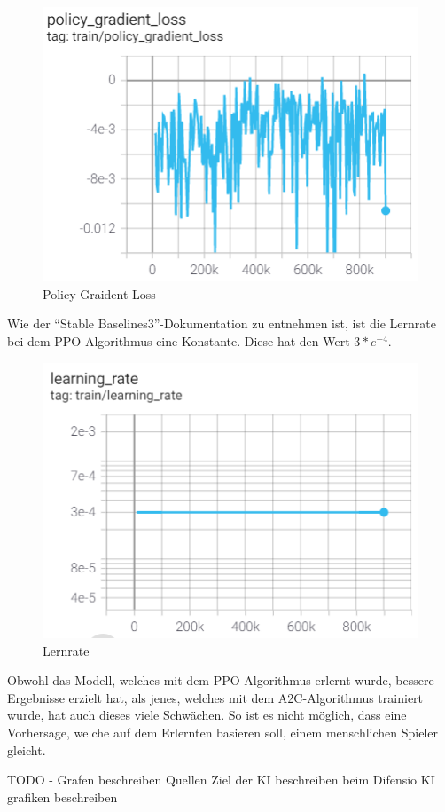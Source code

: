 \begin{figure}[H]
    \centering
    \includegraphics[scale=0.7]{pics/Tensorboard/PPO/policy_loss_new.png}
    \caption{Policy Graident Loss}
    \label{fig:ppo:pgl}
\end{figure}

Wie der ``Stable Baselines3''-Dokumentation %
zu entnehmen ist, ist die Lernrate bei dem PPO Algorithmus eine Konstante.
Diese hat den Wert \(3*e^{-4}\).

\begin{figure}[H]
    \centering
    \includegraphics[scale=0.7]{pics/Tensorboard/PPO/learning_rate_new.png}
    \caption{Lernrate}
    \label{fig:ppo:learningrate}
\end{figure}

Obwohl das Modell, welches mit dem PPO-Algorithmus erlernt wurde,
bessere Ergebnisse erzielt hat, als jenes, welches mit dem A2C-Algorithmus trainiert wurde,
hat auch dieses viele Schwächen. So ist es nicht möglich, dass eine Vorhersage, welche
auf dem Erlernten basieren soll, einem menschlichen Spieler gleicht.



TODO -
Grafen beschreiben
Quellen
Ziel der KI beschreiben beim Difensio
KI grafiken beschreiben